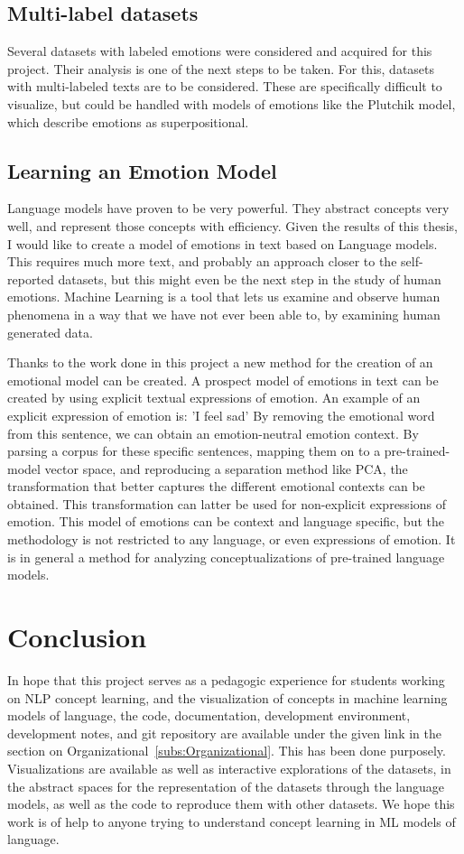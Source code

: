 \subsection{Multi-label datasets}
Several datasets with labeled emotions were considered and acquired for this project. Their analysis is one of the next steps to be taken. For this, datasets with multi-labeled texts are to be considered. These are specifically difficult to visualize, but could be handled with models of emotions like the Plutchik model, which describe emotions as superpositional.


\subsection{Learning an Emotion Model}
Language models have proven to be very powerful. They abstract concepts very well, and represent those concepts with efficiency. Given the results of this thesis, I would like to create a model of emotions in text based on Language models. This requires much more text, and probably an approach closer to the self-reported datasets, but this might even be the next step in the study of human emotions. Machine Learning is a tool that lets us examine and observe human phenomena in a way that we have not ever been able to, by examining human generated data.

Thanks to the work done in this project a new method for the creation of an emotional model can be created. A prospect model of emotions in text can be created by using explicit textual expressions of emotion. An example of an explicit expression of emotion is: 'I feel sad' By removing the emotional word from this sentence, we can obtain an emotion-neutral emotion context. By parsing a corpus for these specific sentences, mapping them on to a pre-trained-model vector space, and reproducing a separation method like PCA, the transformation that better captures the different emotional contexts can be obtained. This transformation can latter be used for non-explicit expressions of emotion.
This model of emotions can be context and language specific, but the methodology is not restricted to any language, or even expressions of emotion. It is in general a method for analyzing conceptualizations of pre-trained language models.

\section{Conclusion}
In hope that this project serves as a pedagogic experience for students working on NLP concept learning, and the visualization of concepts in machine learning models of language, the code, documentation, development environment, development notes, and git repository are available under the given link in the section on Organizational~\ref{subs:Organizational}. This has been done purposely. Visualizations are available as well as interactive explorations of the datasets, in the abstract spaces for the representation of the datasets through the language models, as well as the code to reproduce them with other datasets. We hope this work is of help to anyone trying to understand concept learning in ML models of language.

